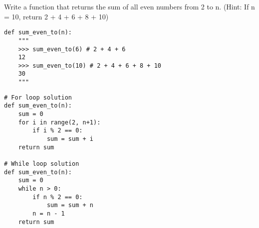 \begin{blocksection}
\question Write a function that returns the sum of all even numbers from 2 to n. 
(Hint: If n = 10, return 2 + 4 + 6 + 8 + 10)

\begin{lstlisting}
def sum_even_to(n): 
    """
    >>> sum_even_to(6) # 2 + 4 + 6
    12
    >>> sum_even_to(10) # 2 + 4 + 6 + 8 + 10
    30
    """

\end{lstlisting}

\begin{solution}[1.5in]
\begin{lstlisting}
# For loop solution
def sum_even_to(n): 
    sum = 0
    for i in range(2, n+1):
        if i % 2 == 0:
            sum = sum + i
    return sum

# While loop solution
def sum_even_to(n): 
    sum = 0
    while n > 0:
        if n % 2 == 0:
            sum = sum + n
        n = n - 1
    return sum
\end{lstlisting}
\end{solution}
\end{blocksection}
